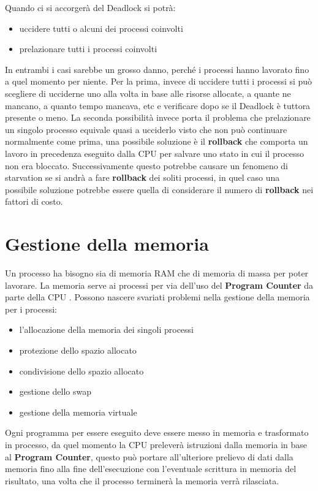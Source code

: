 \documentclass[a4paper, 12pt]{book}
\begin{document}
 Quando ci si accorgerà del Deadlock si potrà:
 \begin{itemize}
     \item uccidere tutti o alcuni dei processi coinvolti
     \item prelazionare tutti i processi coinvolti
 \end{itemize}
 In entrambi i casi sarebbe un grosso danno, perché i processi hanno lavorato fino a quel momento  
 per niente.
 Per la prima, invece di uccidere tutti i processi si può scegliere di ucciderne uno alla volta in base  
 alle risorse allocate, a quante ne mancano, a quanto tempo mancava, etc e verificare dopo se il Deadlock 
 è tuttora presente o meno.
 La seconda possibilità invece porta il problema che prelazionare un singolo processo equivale quasi a ucciderlo 
 visto che non può continuare normalmente come prima, una possibile soluzione è il \textbf{rollback} che comporta
 un lavoro in precedenza eseguito dalla CPU per salvare uno stato in cui il processo non era bloccato.
 Successivamente questo potrebbe causare un fenomeno di starvation se si andrà a fare \textbf{rollback} dei soliti
 processi, in quel caso una possibile soluzione potrebbe essere quella di considerare il numero di \textbf{rollback}
 nei fattori di costo.

 \chapter{Gestione della memoria}

 Un processo ha bisogno sia di memoria RAM che di memoria di massa per poter lavorare. La memoria serve ai processi per
 via dell'uso del \textbf{Program Counter} da parte della CPU .
 Possono nascere svariati problemi nella gestione della memoria per i processi:
 \begin{itemize}
     \item l'allocazione della memoria dei singoli processi
     \item protezione dello spazio allocato
     \item condivisione dello spazio allocato
     \item gestione dello swap
     \item gestione della memoria virtuale
 \end{itemize}
 Ogni programma per essere eseguito deve essere messo in memoria e trasformato in processo, da quel momento la CPU
 preleverà istruzioni dalla memoria in base al \textbf{Program Counter}, questo può portare all'ulteriore prelievo di dati dalla
 memoria fino alla fine dell'esecuzione con l'eventuale scrittura in memoria del risultato, una volta che il processo terminerà
 la memoria verrà rilasciata.
\end{document}
